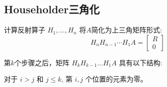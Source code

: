 \subsection{Householder三角化}

计算反射算子 $ H_{1}, \ldots, H_{n} $ 将$A$简化为上三角矩阵形式:
\begin{equation}
H_{n} H_{n-1} \cdots H_{1} A=\left[\begin{array}{l}
R \\
0
\end{array}\right]
\end{equation}


第$k$个步骤之后，矩阵 $ H_{k} H_{k-1} \ldots H_{1} A $ 具有以下结构:

对于 $ i>j $ 和 $ j \leq k $, 第 $  {i},  {j} $ 个位置的元素为零。


